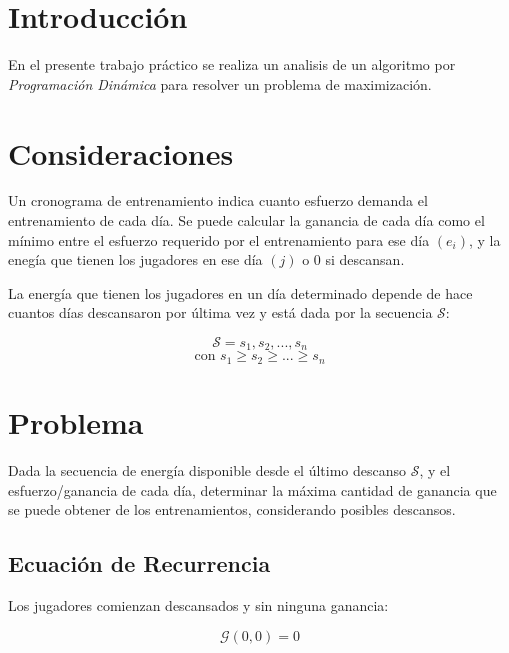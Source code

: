 \section{Introducci\'on}

En el presente trabajo pr\'actico se realiza un analisis de un algoritmo por
\textit{Programaci\'on Din\'amica} para resolver un problema de maximizaci\'on.

\section{Consideraciones}

Un cronograma de entrenamiento indica cuanto esfuerzo demanda el entrenamiento
de cada d\'ia. Se puede calcular la ganancia de cada d\'ia como el m\'inimo
entre el esfuerzo requerido por el entrenamiento para ese d\'ia $\left( e_i
\right)$, y la eneg\'ia que tienen los jugadores en ese d\'ia $\left( j
\right)$ o $0$ si descansan.

La energ\'ia que tienen los jugadores en un d\'ia determinado depende de hace
cuantos d\'ias descansaron por \'ultima vez y est\'a dada por la secuencia
$\mathcal{S}$:

\begin{equation*}
    \mathcal{S} = s_1, s_2, ..., s_n
\end{equation*}
\begin{equation*}
    \text{con } s_1 \ge s_2 \ge ... \ge s_n
\end{equation*}

\section{Problema}

Dada la secuencia de energ\'ia disponible desde el \'ultimo descanso
$\mathcal{S}$, y el esfuerzo/ganancia de cada d\'ia, determinar la m\'axima
cantidad de ganancia que se puede obtener de los entrenamientos, considerando
posibles descansos.

\subsection{Ecuaci\'on de Recurrencia}

Los jugadores comienzan descansados y sin ninguna ganancia:

\begin{equation*}
    \mathcal{G} \left( 0, 0 \right) = 0
\end{equation*}

